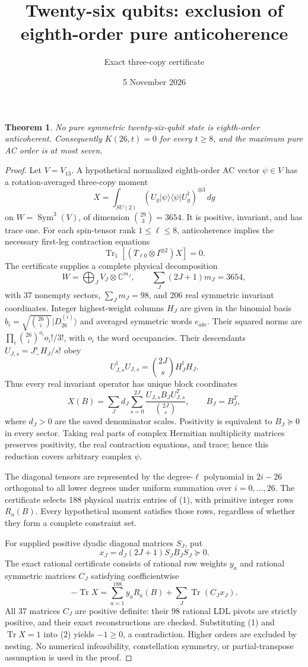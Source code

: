 \documentclass[11pt]{article}
\newtheorem{theorem}{Theorem}
\newcommand{\Tr}{\operatorname{Tr}}
\begin{document}
\title{Twenty-six qubits: exclusion of eighth-order pure anticoherence}
\author{Exact three-copy certificate}\date{5 November 2026}\maketitle
\begin{theorem}
No pure symmetric twenty-six-qubit state is eighth-order anticoherent.
Consequently $K(26,t)=0$ for every $t\ge8$, and the maximum pure AC order is at most seven.
\end{theorem}
\begin{proof}
Let $V=V_{13}$. A hypothetical normalized eighth-order AC vector $\psi\in V$ has a rotation-averaged three-copy moment
\[
X=\int_{SU(2)}(U_g|\psi\rangle\langle\psi|U_g^\dagger)^{\otimes3}\,dg
\]
on $W=\operatorname{Sym}^3(V)$, of dimension $\binom{29}{3}=3654$.
It is positive, invariant, and has trace one. For each spin-tensor rank $1\le\ell\le8$, anticoherence implies the necessary first-leg contraction equations
\[
\Tr_1[(T_{\ell0}\otimes I^{\otimes2})X]=0. \tag{1}
\]
The certificate supplies a complete physical decomposition
\[
W=\bigoplus_J V_J\otimes\mathbb C^{m_J},\qquad
\sum_J(2J+1)m_J=3654,
\]
with 37 nonempty sectors, $\sum_Jm_J=98$, and 206 real symmetric invariant coordinates. Integer highest-weight columns $H_J$ are given in the binomial basis $b_i=\sqrt{\binom{26}{i}}|D_{26}^{(i)}\rangle$ and averaged symmetric words $e_{abc}$. Their squared norms are $\prod_i\binom{26}{i}^{o_i}o_i!/3!$, with $o_i$ the word occupancies. Their descendants $U_{J,s}=J_-^sH_J/s!$ obey
\[
U_{J,s}^\dagger U_{J,s}=\binom{2J}{s}H_J^\dagger H_J.
\]
Thus every real invariant operator has unique block coordinates
\[
X(B)=\sum_Jd_J\sum_{s=0}^{2J}\frac{U_{J,s}B_JU_{J,s}^T}{\binom{2J}{s}},\qquad B_J=B_J^T,
\]
where $d_J>0$ are the saved denominator scales. Positivity is equivalent to $B_J\succeq0$ in every sector. Taking real parts of complex Hermitian multiplicity matrices preserves positivity, the real contraction equations, and trace; hence this reduction covers arbitrary complex $\psi$.

The diagonal tensors are represented by the degree-$\ell$ polynomial in $2i-26$ orthogonal to all lower degrees under uniform summation over $i=0,\ldots,26$. The certificate selects 188 physical matrix entries of (1), with primitive integer rows $R_a(B)$. Every hypothetical moment satisfies those rows, regardless of whether they form a complete constraint set.

For supplied positive dyadic diagonal matrices $S_J$, put
\[
x_J=d_J(2J+1)S_JB_JS_J\succeq0.
\]
The exact rational certificate consists of rational row weights $y_a$ and rational symmetric matrices $C_J$ satisfying coefficientwise
\[
\boxed{-\Tr X=\sum_{a=1}^{188}y_aR_a(B)+\sum_J\Tr(C_Jx_J).} \tag{2}
\]
All 37 matrices $C_J$ are positive definite: their 98 rational LDL pivots are strictly positive, and their exact reconstructions are checked. Substituting (1) and $\Tr X=1$ into (2) yields $-1\ge0$, a contradiction. Higher orders are excluded by nesting. No numerical infeasibility, constellation symmetry, or partial-transpose assumption is used in the proof.
\end{proof}
\end{document}
